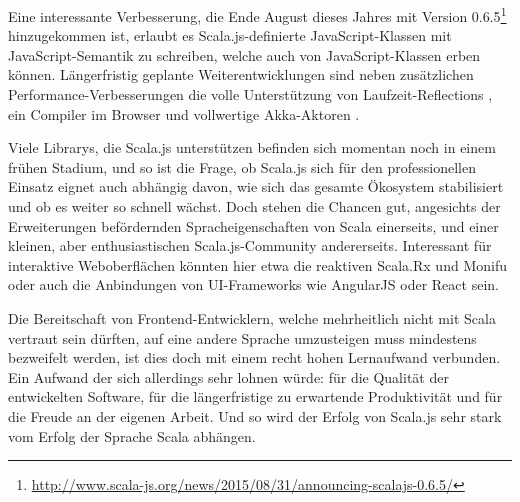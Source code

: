 \documentclass[a4paper, 12pt, hidelinks, listof=totoc, listoftables=totoc, bibliography=totoc]{scrreprt}
\begin{document}
Eine interessante Verbesserung, die Ende August dieses Jahres mit Version 0.6.5\footnote{\url{http://www.scala-js.org/news/2015/08/31/announcing-scalajs-0.6.5/}} hinzugekommen ist, erlaubt es Scala.js-definierte JavaScript-Klassen mit JavaScript-Semantik zu schreiben, welche auch von JavaScript-Klassen erben können. Längerfristig geplante Weiterentwicklungen sind neben zusätzlichen Performance-Verbesserungen die volle Unterstützung von Laufzeit-Reflections \cite[S. 2]{doeraene2013.TDI}, ein Compiler im Browser \cite[Folie 39, Min. 39]{doeraene2014.WHB} und vollwertige Akka-Aktoren \cite[Folie 39, Min. 39]{doeraene2014.WHB}.

Viele Librarys, die Scala.js unterstützen befinden sich momentan noch in einem frühen Stadium, und so ist die Frage, ob Scala.js sich für den professionellen Einsatz eignet auch abhängig davon, wie sich das gesamte Ökosystem stabilisiert und ob es weiter so schnell wächst. Doch stehen die Chancen gut, angesichts der Erweiterungen befördernden Spracheigenschaften von Scala einerseits, und einer kleinen, aber enthusiastischen Scala.js-Community andererseits. Interessant für interaktive Weboberflächen könnten hier etwa die reaktiven Scala.Rx und Monifu oder auch die Anbindungen von UI-Frameworks wie AngularJS oder React sein.

Die Bereitschaft von Frontend-Entwicklern, welche mehrheitlich nicht mit Scala vertraut sein dürften, auf eine andere Sprache umzusteigen muss mindestens bezweifelt werden, ist dies doch mit einem recht hohen Lernaufwand verbunden. Ein Aufwand der sich allerdings sehr lohnen würde: für die Qualität der entwickelten Software, für die längerfristige zu erwartende Produktivität und für die Freude an der eigenen Arbeit. Und so wird der Erfolg von Scala.js sehr stark vom Erfolg der Sprache Scala abhängen.


\end{document}
